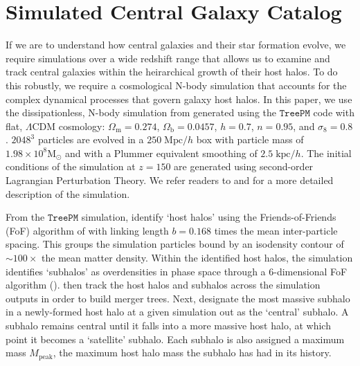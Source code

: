 \section{Simulated Central Galaxy Catalog} \label{sec:treepm}
If we are to understand how central galaxies and their star formation 
evolve, we require simulations over a wide redshift range that allows 
us to examine and track central galaxies within the heirarchical growth 
of their host halos. To do this robustly, we require a cosmological 
N-body simulation that accounts for the complex dynamical processes 
that govern galaxy host halos. In this paper, we use the dissipationless, 
N-body simulation from \cite{Wetzel:2013aa} generated using the 
\cite{White:2002aa} $\mathtt{TreePM}$ code with flat,
$\Lambda$CDM cosmology: $\Omega_\mathrm{m} = 0.274$, 
$\Omega_\mathrm{b} = 0.0457$, $h = 0.7$, $n = 0.95$, and
$\sigma_8 = 0.8$. $2048^3$ particles are evolved in a $250\;\mathrm{Mpc}/h$ 
box with particle mass of $1.98 \times 10^{8}\mathrm{M}_\odot$ and with a Plummer 
equivalent smoothing of $2.5\;\mathrm{kpc}/h$. The initial conditions of 
the simulation at $z = 150$ are generated using second-order Lagrangian 
Perturbation Theory. We refer readers to \cite{Wetzel:2013aa} and 
\cite{Wetzel:2014aa} for a more detailed description of the simulation. 

From the $\mathtt{TreePM}$ simulation, \cite{Wetzel:2013aa} identify 
`host halos' using the Friends-of-Friends (FoF) 
algorithm of \cite{Davis:1985aa} with linking length $b = 0.168$ times the mean 
inter-particle spacing. This groups the simulation particles bound by an isodensity 
contour of $\sim 100\times$ the mean matter density. Within the identified host halos, 
the simulation identifies `subhalos' as overdensities in phase space 
through a 6-dimensional FoF algorithm (\citealt{White:2010aa}). 
\cite{Wetzel:2013aa} then track the host halos and subhalos
across the simulation outputs in order to build merger trees. 
Next, \cite{Wetzel:2013aa} designate the most massive subhalo 
in a newly-formed host halo at a given 
simulation out as the `central' subhalo. A subhalo remains central until it falls 
into a more massive host halo, at which point it becomes a `satellite' subhalo.  
Each subhalo is also assigned a maximum mass $M_\mathrm{peak}$, the 
maximum host halo mass the subhalo has had in its history. 

